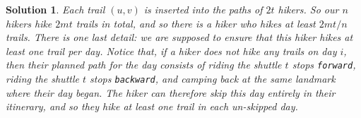 \documentclass{article}\usepackage[a4paper,margin=20mm]{geometry}
\newcommand{\forward}{\texttt{forward}}
\newcommand{\backward}{\texttt{backward}}
\newtheorem{solution}[theorem]{Solution}
\begin{document}
\begin{solution}
Each trail $(u, v)$ is inserted into the paths of $2t$ hikers.
So our $n$ hikers hike $2mt$ trails in total, and so there is a hiker who hikes at least $2mt/n$ trails.
There is one last detail: we are supposed to ensure that this hiker hikes at least one trail per day.
Notice that, if a hiker does not hike any trails on day $i$, then their planned path for the day consists of riding the shuttle $t$ stops \forward{}, riding the shuttle $t$ stops \backward{}, and camping back at the same landmark where their day began.
The hiker can therefore skip this day entirely in their itinerary, and so they hike at least one trail in each un-skipped day.
\end{solution}




\end{document}
